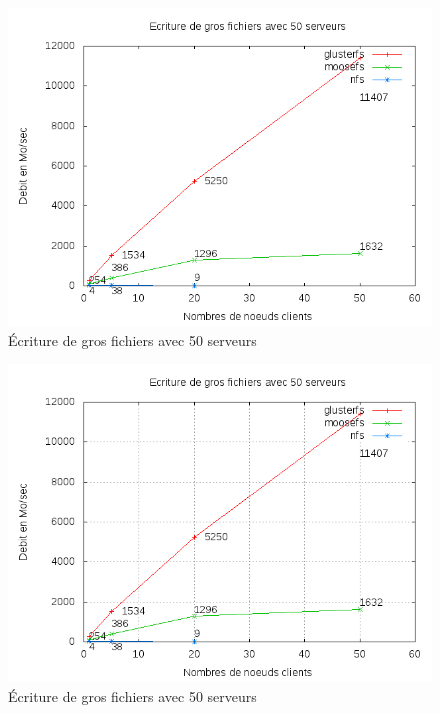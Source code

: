 \documentclass[12pt]{report}
\begin{document}
\begin{figure}[H]
\begin{center}
\includegraphics[bb=0 0 640 480,width=14cm]{images/srv50wb.png}
\caption{Écriture de gros fichiers avec 50 serveurs}
\end{center}
\end{figure} 
\begin{figure}[H]
\begin{center}
\includegraphics[bb=0 0 640 480,width=14cm]{images/srv50wb2.png}
\caption{Écriture de gros fichiers avec 50 serveurs}
\end{center}
\end{figure} 
\end{document}
